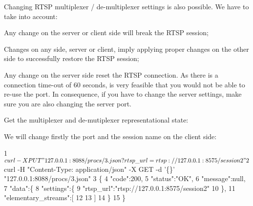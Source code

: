 Changing R\+T\+SP multiplexer / de-\/multiplexer settings is also possible. We have to take into account\+:
\begin{DoxyItemize}
\item Any change on the server or client side will break the R\+T\+SP session;
\item Changes on any side, server or client, imply applying proper changes on the other side to successfully restore the R\+T\+SP session;
\item Any change on the server side reset the R\+T\+SP connection. As there is a connection time-\/out of 60 seconds, is very feasible that you would not be able to re-\/use the port. In consequence, if you have to change the server settings, make sure you are also changing the server port.
\end{DoxyItemize}

Get the multiplexer and de-\/mutiplexer representational state\+:




We will change firstly the port and the session name on the client side\+:


\begin{DoxyCode}
1 $ curl -X PUT "127.0.0.1:8088/procs/3.json?rtsp\_url=rtsp://127.0.0.1:8575/session2"
2 $ curl -H "Content-Type: application/json" -X GET -d '\{\}' "127.0.0.1:8088/procs/3.json"
3 \{
4    "code":200,
5    "status":"OK",
6    "message":null,
7    "data":\{
8       "settings":\{
9          "rtsp\_url":"rtsp://127.0.0.1:8575/session2"
10       \},
11       "elementary\_streams":[
12 
13       ]
14    \}
15 \}
\end{DoxyCode}


